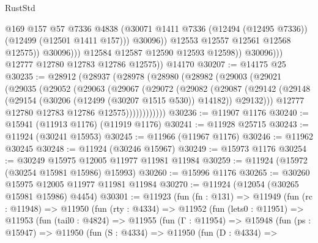 \begin{lexlean}{RustStd}
\begin{coremodule}
                                @169
                                @157
                                @57
                                @7336
                                @4838
                                (@30071
                                  @1411
                                  @7336
                                  (@12494 (@12495 @7336))
                                  (@12499 (@12501 @1411 @157)))
                                @30096))
                            @12553
                            @12557
                            @12561
                            @12568
                            @12575))
                        @30096)))
                  @12584
                  @12587
                  @12590
                  @12593
                  @12598))
              @30096)))
        @12777
        @12780
        @12783
        @12786
        @12575))
    @14170
@30207 := @14175 @25
@30235 := @28912
    (@28937
      (@28978
        (@28980
          (@28982
            (@29003
              (@29021
                (@29035
                  (@29052
                    (@29063
                      (@29067
                        (@29072
                          (@29082
                            (@29087
                              (@29142
                                (@29148
                                  (@29154 (@30206 (@12499 (@30207 @1515 @530)) @14182))
                                  @29132)))
                            @12777
                            @12780
                            @12783
                            @12786
                            @12575))))))))))))
@30236 := @11907 @1176
@30240 := @15941 (@11913 @1176) (@11919 @1176)
@30241 := @11928 @25715
@30243 := @11924 (@30241 @15953)
@30245 := @11966 (@11967 @1176)
@30246 := @11962 @30245
@30248 := @11924 (@30246 @15967)
@30249 := @15973 @1176
@30254 := @30249 @15975 @12005 @11977 @11981 @11984
@30259 := @11924 (@15972 (@30254 @15981 @15986) @15993)
@30260 := @15996 @1176
@30265 := @30260 @15975 @12005 @11977 @11981 @11984
@30270 := @11924 (@12054 (@30265 @15981 @15986) @4454)
@30301 := @11923
    (fun (fn : @131) =>
    @11949
      (fun (rc : @11948) =>
      @11950
        (fun (rty : @4334) =>
        @11952
          (fun (lets0 : @11951) =>
          @11953
            (fun (tail0 : @4824) =>
            @11955
              (fun (Γ : @11954) =>
              @15948
                (fun (ps : @15947) =>
                @11950
                  (fun (S : @4334) =>
                  @11950
                    (fun (D : @4334) =>

\end{coremodule}
\end{lexlean}
